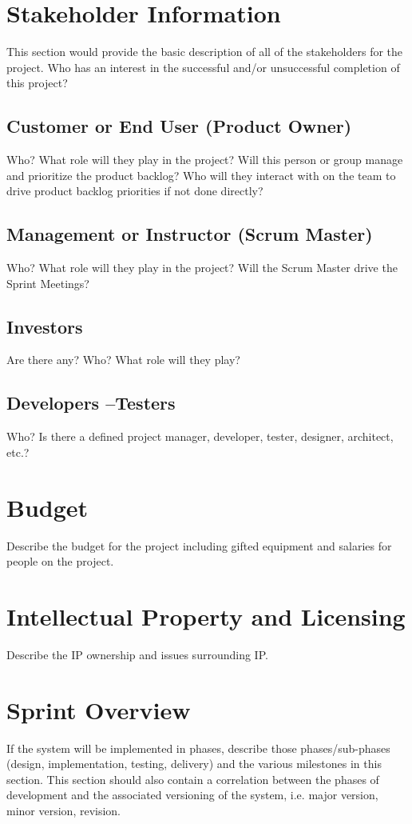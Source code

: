 \section{ Stakeholder Information}


This section would provide the basic description of all of the stakeholders for 
the project.  Who has an interest in the successful and/or unsuccessful completion 
of this project? 


\subsection{Customer or End User (Product Owner)}
Who?  What role will they play in the project?  Will this person or group manage 
and prioritize the product backlog?  Who will they interact with on the team to 
drive product backlog priorities if not done directly? 

\subsection{Management or Instructor (Scrum Master)}
Who?  What role will they play in the project?  Will the Scrum Master drive the 
Sprint Meetings? 


\subsection{Investors}
Are there any?  Who?  What role will they play? 


\subsection{Developers --Testers}
Who?  Is there a defined project manager, developer, tester, designer, architect, 
etc.? 

\section{Budget}
Describe the budget for the project including gifted equipment and salaries for 
people on the project.

\section{Intellectual Property and Licensing}
Describe the IP ownership and issues surrounding IP.

\section{Sprint  Overview}
If the system will be implemented in phases, describe those phases/sub-phases (design, 
implementation, testing, delivery) and the various milestones in this section. 
 This section should also contain a correlation between the phases of development 
and the associated versioning of the system, i.e. major version, minor version, 
revision. 

